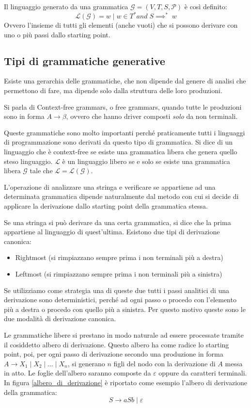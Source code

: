 \documentclass[class=book, crop=false, oneside, 12pt]{standalone}
\begin{document}
Il linguaggio generato da una grammatica \(\mathcal{G} = (V,T,S,\mathcal{P})\) è così definito:
\begin{equation}
    \mathcal{L}(\mathcal{G}) = {w \mid w \in T^* and \; S \implies^* \; w }
\end{equation}
Ovvero l'insieme di tutti gli elementi (anche vuoti) che si possono derivare con uno o più passi dallo starting point.

\subsection{Tipi di grammatiche generative}
Esiste una gerarchia delle grammatiche, che non dipende dal genere di analisi che permettono di fare, ma dipende solo dalla struttura delle loro produzioni.

Si parla di Context-free grammars, o free grammars, quando tutte le produzioni sono in forma \(A \to \beta\), ovvero che hanno driver composti \emph{solo} da non terminali.

Queste grammatiche sono molto importanti perché praticamente tutti i linguaggi di programmazione sono derivati da questo tipo di grammatica.
Si dice di un linguaggio che è context-free se esiste una grammatica libera che genera quello steso linguaggio.
\(\mathcal{L}\) è un linguaggio libero se e solo se esiste una grammatica libera \(\mathcal{G}\) tale che \(\mathcal{L}=\mathcal{L}(\mathcal{G})\).

L’operazione di analizzare una stringa e verificare se appartiene ad una determinata grammatica dipende naturalmente dal metodo con cui si decide di applicare la derivazione dallo starting point della grammatica stessa.

Se una stringa si può derivare da una certa grammatica, si dice che la prima appartiene al linguaggio di quest'ultima.
Esistono due tipi di derivazione canonica:
\begin{itemize}
    \item Rightmost (si rimpiazzano sempre prima i non terminali più a destra)
    \item Leftmost (si rimpiazzano sempre prima i non terminali più a sinistra)
\end{itemize}
Se utilizziamo come strategia una di queste due tutti i passi analitici di una derivazione sono deterministici, perché ad ogni passo o procedo con l’elemento più a destra o procedo con quello più a sinistra. Per questo motivo queste sono le due modalità di derivazione canonica.

Le grammatiche libere si prestano in modo naturale ad essere processate tramite il cosiddetto albero di derivazione.
Questo albero ha come radice lo starting point, poi, per ogni passo di derivazione secondo una produzione in forma \(A \to X_1 \mid X_2 \mid\dots\mid X_n \), si generano \(n\) figli del nodo con la derivazione di \(A\) messa in atto.
Le foglie dell’albero saranno composte da \(\varepsilon\) oppure da caratteri terminali. In figura \ref{albero_di_derivazione} è riportato come esempio l'albero di derivazione della grammatica:
\begin{equation}
    S \to aSb \mid \varepsilon
    \label{grammatica_allbero}
\end{equation}
\end{document}
